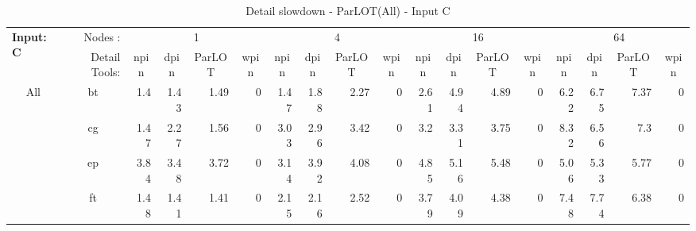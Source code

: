 \begin{table}[]
\caption{Detail slowdown - ParLOT(All) - Input C}
\label{det_all_all_C_p3.5}
\begin{center}
\begin{tabular}{|c|c|rrrr|rrrr|rrrr|rrrr|}
\hline
\multicolumn{1}{|l|}{\multirow{2}{*}{\textbf{Input: C}}} & \multicolumn{1}{r|}{Nodes :}       & \multicolumn{4}{c|}{1}                                                                                       & \multicolumn{4}{c|}{4}                                                                                       & \multicolumn{4}{c|}{16}                                                                                      & \multicolumn{4}{c|}{64}                                                                                      \\ \cline{2-18} 
\multicolumn{1}{|l|}{}                                   & \multicolumn{1}{r|}{Detail Tools:} & \multicolumn{1}{c}{npin} & \multicolumn{1}{c}{dpin} & \multicolumn{1}{c}{ParLOT} & \multicolumn{1}{c|}{wpin} & \multicolumn{1}{c}{npin} & \multicolumn{1}{c}{dpin} & \multicolumn{1}{c}{ParLOT} & \multicolumn{1}{c|}{wpin} & \multicolumn{1}{c}{npin} & \multicolumn{1}{c}{dpin} & \multicolumn{1}{c}{ParLOT} & \multicolumn{1}{c|}{wpin} & \multicolumn{1}{c}{npin} & \multicolumn{1}{c}{dpin} & \multicolumn{1}{c}{ParLOT} & \multicolumn{1}{c|}{wpin} \\ \hline
\hline
 \multirow{9}{*}{All} 
 & bt &           1.4 &          1.43 &         1.49 &             0 &        1.47 &          1.88 &         2.27 &             0 &         2.61 &           4.94 &          4.89 &              0  &          6.22 &           6.75 &          7.37 &              0 \\
 & cg &          1.47 &          2.27 &         1.56 &             0 &        3.03 &          2.96 &         3.42 &             0 &          3.2 &           3.31 &          3.75 &              0  &          8.32 &           6.56 &           7.3 &              0 \\
 & ep &          3.84 &          3.48 &         3.72 &             0 &        3.14 &          3.92 &         4.08 &             0 &         4.85 &           5.16 &          5.48 &              0  &          5.06 &           5.33 &          5.77 &              0 \\
 & ft &          1.48 &          1.41 &         1.41 &             0 &        2.15 &          2.16 &         2.52 &             0 &         3.79 &           4.09 &          4.38 &              0  &          7.48 &           7.74 &          6.38 &              0 \\

\end{tabular}
\end{center}
\end{table}
